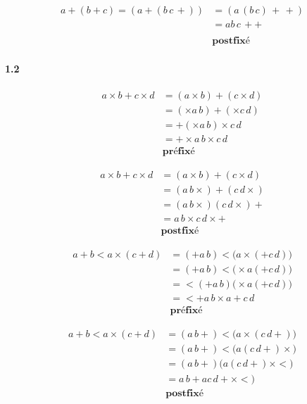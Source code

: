 \documentclass{report}
\begin{document}
\begin{multicols*}{3}
\begin{align*}
    a + (b + c) = (a + (b \, c \, +)) 
             &= (a \, ( b \, c) \, + \, + ) \\
             &= a  b \, c \, + +\\
             \\
             & \textbf{postfixé}  
\end{align*}


\paragraph{1.2}
\begin{align*}
    a \times b + c \times d &= (a \times b) + (c \times d) 
                    \\
                  &= (\times a \, b) + (\times c \, d) 
                    \\
                  &= + (\times a \, b) \times c \, d
                    \\
                  &= + \times a \, b \times c \, d
                    \\
                  & \textbf{préfixé}
\end{align*}    

\begin{align*}
    a \times b + c \times d &= (a \times b) + (c \times d) 
    \\
            &= (a \, b \times) + (c \, d \times)
    \\
            &= (a \, b \times) (c \, d \times) + 
    \\ 
            &= a \, b \times c \, d \times +
    \\
            & \textbf{postfixé}
\end{align*}


\begin{align*}
    a + b < a \times (c + d) &= (+ a \, b) < \bigl( a \times (+ c \, d) \bigr)      
    \\ 
            &= (+ a \, b ) < \bigl( \times a (+ c \, d)\bigr)
    \\ 
            &= < (+ a \, b )  \bigl( \times a (+ c \, d)\bigr)
    \\
            &= < + a \, b  \times a + c \, d
    \\
                  & \textbf{préfixé}
\end{align*}


\begin{align*}
    a + b < a \times (c + d) &= (a \, b +) < \bigl( a \times (c \, d +) \bigr)
    \\ 
            &= (a \, b +) < \bigl( a  (c \, d +) \times \bigr)
    \\
            &= (a \, b +)  \bigl( a  (c \, d +) \times < \bigr)
    \\
            &= a \, b +  a  c \, d + \times < \bigr)
            \\
            & \textbf{postfixé}
\end{align*}



\end{multicols*}
\end{document}
